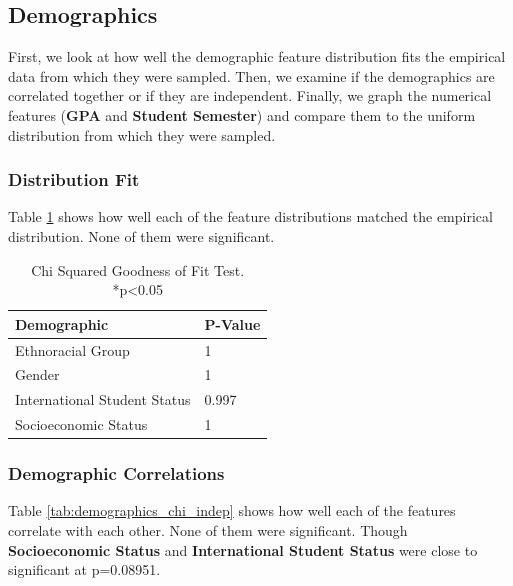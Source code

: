 \documentclass{article}
\begin{document}
\subsection{Demographics}\label{demographics-1}

\label{sec:demographics_res}

First, we look at how well the demographic feature distribution fits the empirical data from which they were sampled. Then, we examine if the demographics are correlated together or if they are independent. Finally, we graph the numerical features (\textbf{GPA} and \textbf{Student Semester}) and compare them to the uniform distribution from which they were sampled.

\subsubsection{Distribution Fit}\label{distribution-fit}

Table \ref{tab:demographics_chi_gof} shows how well each of the feature distributions matched the empirical distribution. None of them were significant.

\begin{table}[htbp]
  \centering
  \begin{tabular}{|l|l|}
    \hline
    \textbf{Demographic} & \textbf{P-Value} \\ \hline
    Ethnoracial Group & 1 \\ \hline
    Gender & 1 \\ \hline
    International Student Status & 0.997 \\ \hline
    Socioeconomic Status & 1 \\ \hline
  \end{tabular}
  \caption{Chi Squared Goodness of Fit Test. *p<0.05}
  \label{tab:demographics_chi_gof}
\end{table}

\subsubsection{Demographic Correlations}\label{demographic-correlations}

Table \ref{tab:demographics_chi_indep} shows how well each of the features correlate with each other. None of them were significant. Though \textbf{Socioeconomic Status} and \textbf{International Student Status} were close to significant at p=0.08951.
\end{document}
